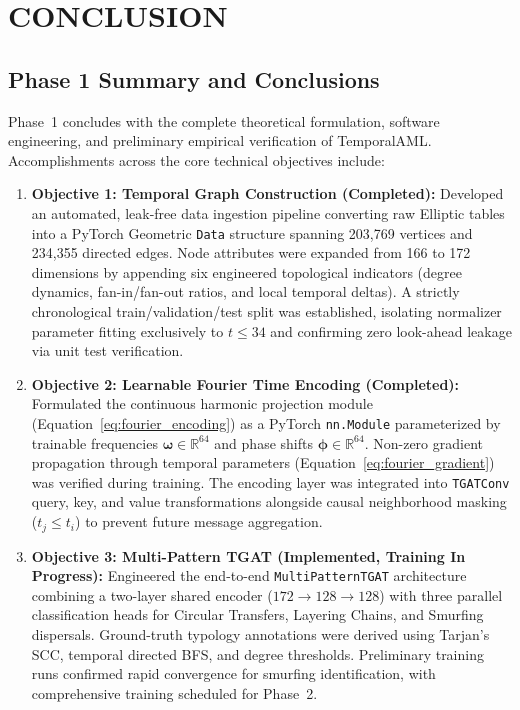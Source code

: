 \chapter{CONCLUSION}
\label{ChapterConclusion}

\section{Phase 1 Summary and Conclusions}
\label{sec:phase1_conclusions}

Phase~1 concludes with the complete theoretical formulation, software engineering, and preliminary empirical verification of TemporalAML. Accomplishments across the core technical objectives include:

\begin{enumerate}
    \item \textbf{Objective 1: Temporal Graph Construction (Completed):} Developed an automated, leak-free data ingestion pipeline converting raw Elliptic tables into a PyTorch Geometric \texttt{Data} structure spanning 203,769 vertices and 234,355 directed edges. Node attributes were expanded from 166 to 172 dimensions by appending six engineered topological indicators (degree dynamics, fan-in/fan-out ratios, and local temporal deltas). A strictly chronological train/validation/test split was established, isolating normalizer parameter fitting exclusively to $t \leq 34$ and confirming zero look-ahead leakage via unit test verification.

    \item \textbf{Objective 2: Learnable Fourier Time Encoding (Completed):} Formulated the continuous harmonic projection module (Equation~\ref{eq:fourier_encoding}) as a PyTorch \texttt{nn.Module} parameterized by trainable frequencies $\boldsymbol{\omega} \in \mathbb{R}^{64}$ and phase shifts $\boldsymbol{\phi} \in \mathbb{R}^{64}$. Non-zero gradient propagation through temporal parameters (Equation~\ref{eq:fourier_gradient}) was verified during training. The encoding layer was integrated into \texttt{TGATConv} query, key, and value transformations alongside causal neighborhood masking ($t_j \leq t_i$) to prevent future message aggregation.

    \item \textbf{Objective 3: Multi-Pattern TGAT (Implemented, Training In Progress):} Engineered the end-to-end \texttt{MultiPatternTGAT} architecture combining a two-layer shared encoder ($172 \to 128 \to 128$) with three parallel classification heads for Circular Transfers, Layering Chains, and Smurfing dispersals. Ground-truth typology annotations were derived using Tarjan's SCC, temporal directed BFS, and degree thresholds. Preliminary training runs confirmed rapid convergence for smurfing identification, with comprehensive training scheduled for Phase~2.


\end{enumerate}
